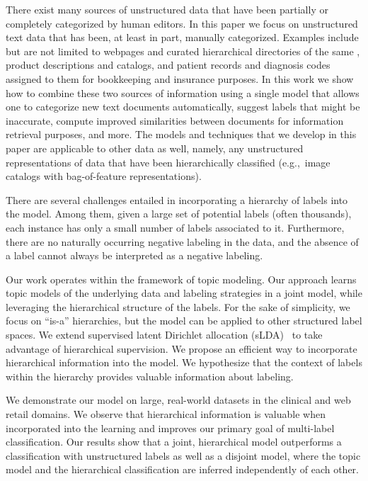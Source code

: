 There exist many sources of unstructured data that have been partially or
completely categorized by human editors.  In this paper we focus on
unstructured text data that has been, at least in part, manually
categorized.  Examples include but are not limited to webpages and curated
hierarchical directories of the same \citep{DMOZ}, product descriptions and
catalogs, %
and patient records %
and diagnosis codes assigned to them for bookkeeping and insurance purposes.
In this work we show how to combine 
these two sources of information using a single model that allows one to
categorize new text documents automatically, suggest labels that might be
inaccurate, compute improved similarities between documents for information
retrieval purposes, and more. The models and techniques that we develop in
this paper are applicable to other data as well, namely, any unstructured
representations of data that have been hierarchically classified (e.g.,~image
catalogs with bag-of-feature representations).

There are several challenges entailed in incorporating a hierarchy of labels
into the model. Among them, given a large set of potential labels (often thousands), each
instance has only a small number of labels associated to it. Furthermore, there are no
naturally occurring negative labeling in the data, and the absence of a label
cannot always be interpreted as a negative labeling. 

Our work operates within the framework of topic modeling. Our approach learns
topic models of the underlying data and labeling strategies in a joint model,
while leveraging the hierarchical structure of the labels. For the sake of
simplicity, we focus on ``is-a'' hierarchies, but the model can be
applied to other structured label spaces. We extend supervised latent Dirichlet
allocation (sLDA)~\cite{BleiMcAuliffe2008} to take advantage of hierarchical
supervision. We propose an efficient way to incorporate hierarchical
information into the model. We hypothesize that the context of labels within
the hierarchy provides valuable information about labeling. 

We demonstrate our model on large, real-world datasets in the clinical and web
retail domains. We observe that hierarchical information is valuable when
incorporated into the learning and improves our primary goal of multi-label
classification. Our results show that a joint, hierarchical model outperforms a
classification with unstructured labels as well as a disjoint model, where the
topic model and the hierarchical classification are inferred
independently of each other. 

